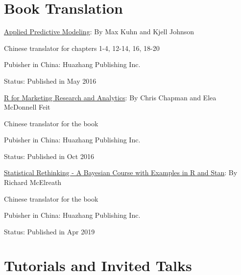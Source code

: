 \documentclass[11pt,]{article}
\providecommand{\tightlist}{%
  \setlength{\itemsep}{0pt}\setlength{\parskip}{0pt}}
\renewenvironment{itemize}{
  \begin{list}{}{
    \setlength{\leftmargin}{1.5em}
  }
}{
  \end{list}
}
\begin{document}
\hypertarget{book-translation}{%
\section{Book Translation}\label{book-translation}}

\begin{itemize}
\tightlist
\item
  \href{http://appliedpredictivemodeling.com}{Applied Predictive
  Modeling}: By Max Kuhn and Kjell Johnson

  \begin{itemize}
  \tightlist
  \item
    Chinese translator for chapters 1-4, 12-14, 16, 18-20
  \item
    Pubisher in China: Huazhang Publishing Inc.
  \item
    Status: Published in May 2016
  \end{itemize}
\item
  \href{http://r-marketing.r-forge.r-project.org}{R for Marketing
  Research and Analytics}: By Chris Chapman and Elea McDonnell Feit

  \begin{itemize}
  \tightlist
  \item
    Chinese translator for the book
  \item
    Pubisher in China: Huazhang Publishing Inc.
  \item
    Status: Published in Oct 2016
  \end{itemize}
\item
  \href{http://xcelab.net/rm/statistical-rethinking/}{Statistical
  Rethinking - A Bayesian Course with Examples in R and Stan}: By
  Richard McElreath

  \begin{itemize}
  \tightlist
  \item
    Chinese translator for the book
  \item
    Pubisher in China: Huazhang Publishing Inc.
  \item
    Status: Published in Apr 2019
  \end{itemize}
\end{itemize}

\hypertarget{tutorials-and-invited-talks}{%
\section{Tutorials and Invited
Talks}\label{tutorials-and-invited-talks}}
\end{document}
